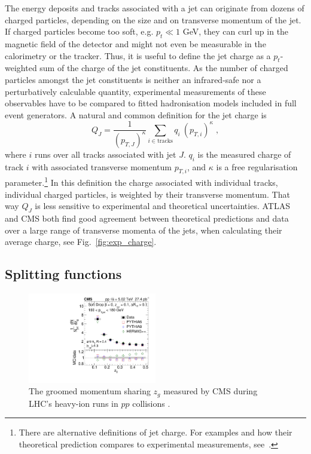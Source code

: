 The energy deposits and tracks associated with a jet can originate from dozens of charged particles, depending on the size and on transverse momentum of the jet. If charged particles become too soft, e.g. $p_t \ll 1$ GeV, they can curl up in the magnetic field of the detector and might not even be measurable in the calorimetry or the tracker. Thus, it is useful to define the jet charge as a $p_t$-weighted sum of the charge of the jet constituents.
As the number of charged particles amongst the jet constituents is neither an infrared-safe nor a perturbatively calculable quantity, experimental measurements of these observables have to be compared to fitted hadronisation models included in full event generators.
%
A natural and common definition for the jet charge is  \cite{Aad:2015cua,Sirunyan:2017tyr} 
\begin{equation}
Q_J = \frac{1}{(p_{T,J})^\kappa} \sum_{i \in \mathrm{tracks}} q_i ~(p_{T,i})^\kappa \;,
\end{equation}
where $i$ runs over all tracks associated with jet $J$. $q_i$ is the
measured charge of track $i$ with associated transverse momentum
$p_{T,i}$, and $\kappa$ is a free regularisation
parameter.\footnote{There are alternative definitions of jet
  charge. For examples and how their theoretical prediction compares
  to experimental measurements, see~\cite{Sirunyan:2017tyr}.} In this
definition the charge associated with individual tracks, \ie
individual charged particles, is weighted by their transverse
momentum.
%
That way $Q_J$ is less sensitive to experimental and theoretical uncertainties. 
ATLAS and CMS both find good agreement between theoretical predictions and data over a large range of transverse momenta of the jets, when calculating their average charge, see Fig.~\ref{fig:exp_charge}. 



\subsection{Splitting functions}

\begin{figure}[t]
  \includegraphics[width=0.5\textwidth]{figures/splitting_cms.pdf}\hfill%
  \begin{minipage}[b]{0.42\textwidth}
    \caption{The groomed momentum sharing $z_g$ measured by CMS during LHC's heavy-ion runs in $pp$ collisions \cite{Sirunyan:2017bsd}.}
    \label{fig:exp_splitting}
    \vspace*{1.4cm}
  \end{minipage}\hspace*{0.3cm}
\end{figure}

